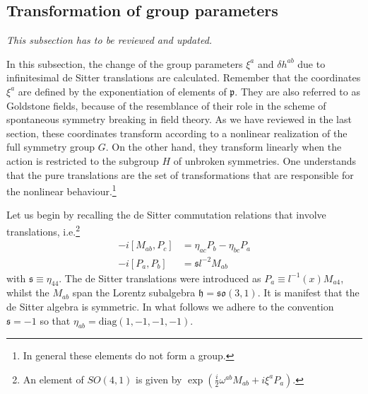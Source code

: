 \documentclass[11pt]{article}
\begin{document}
\subsection{Transformation of group parameters}

{\blu\it This subsection has to be reviewed and updated.}

In this subsection, the change of the group parameters $\xi^a$ 
and $\delta h^{ab}$ due to infinitesimal de Sitter translations 
are calculated. Remember that the coordinates $\xi^a$ are defined 
by the exponentiation of elements of $\mathfrak{p}$. They are 
also referred to as Goldstone fields, because of the resemblance 
of their role in the scheme of spontaneous symmetry breaking in 
field theory. As we have reviewed in the last section, these 
coordinates transform according to a nonlinear realization of the 
full symmetry group $G$. On the other hand, they transform 
linearly when the action is restricted to the subgroup $H$ of 
unbroken symmetries.  One understands that the pure translations 
are the set of transformations that are responsible for the 
nonlinear behaviour.\footnote{In general these elements do not 
	form a group.}

Let us begin by recalling the de Sitter commutation relations 
that involve translations, i.e.\footnote{An element of $SO(4,1)$ 
	is given by $\exp(\tfrac{i}{2}\omega^{ab}M_{ab} + i\xi^a 
	P_a)$.}
%
\begin{equation}\label{eq:comm_rels_dS}
	\begin{split}
		-i[M_{ab},P_c] &= \eta_{ac}P_b - \eta_{bc}P_a \\
		-i[P_a,P_b] &= \mathfrak{s}l^{-2} M_{ab}
	\end{split}
\end{equation}
with $\mathfrak{s} \equiv \eta_{44}$. The de Sitter translations 
were introduced as $P_a \equiv l^{-1}(x)M_{a4}$, whilst the 
$M_{ab}$ span the Lorentz subalgebra $\mathfrak{h} = 
\mathfrak{so}(3,1)$.  It is manifest that the de Sitter algebra 
is symmetric.  In what follows we adhere to the convention 
$\mathfrak{s} = -1$ so that $\eta_{ab} = 
\mathrm{diag}(1,-1,-1,-1)$.
\end{document}
